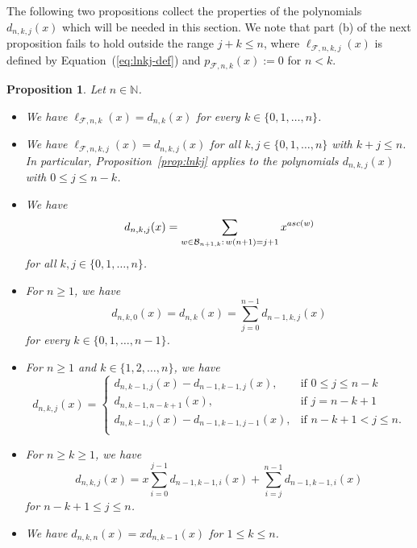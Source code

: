 \documentclass[11pt]{amsart}
\newtheorem{proposition}[theorem]{Proposition}
\newcommand{\asc}{{\rm asc}}
\newcommand{\bB}{{\mathcal B}}
\newcommand{\fF}{{\mathcal F}}
\newcommand{\NN}{{\mathbb N}}
\begin{document}
The following two propositions collect the 
properties of the polynomials $d_{n,k,j}(x)$ which
will be needed in this section. We note that part 
(b) of the next proposition fails to hold outside 
the range $j+k \le n$, where $\ell_{\fF,n,k,j}(x)$
is defined by Equation~(\ref{eq:lnkj-def}) and 
$p_{\fF,n,k}(x) := 0$ for $n<k$.
%
\begin{proposition} \label{prop:dnkj} 
Let $n \in \NN$.
%
\begin{itemize}
\itemsep=0pt
\item[(a)] 
We have $\ell_{\fF,n,k}(x) = d_{n,k}(x)$ for every 
$k \in \{0, 1,\dots,n\}$.

\item[(b)] 
We have $\ell_{\fF,n,k,j}(x) = d_{n,k,j}(x)$ for all 
$k, j \in \{0, 1,\dots,n\}$ with $k + j \le n$. In 
particular, Proposition~\ref{prop:lnkj} applies to 
the polynomials $d_{n,k,j}(x)$ with $0 \le j \le n-k$.

\item[(c)] 
We have 
%
\[ d_{n,k,j}(x) = \sum_{w \in \bB_{n+1,k}: \, 
                  w(n+1) = j+1} x^{\asc(w)} \]
%
for all $k, j \in \{0, 1,\dots,n\}$.

\item[(d)] 
For $n \ge 1$, we have
%
\[ d_{n,k,0}(x) = d_{n,k}(x) = \sum_{j=0}^{n-1} 
                  d_{n-1,k,j}(x) \]
%
for every $k \in \{0, 1,\dots,n-1\}$.

\item[(e)] 
For $n \ge 1$ and $k \in \{1, 2,\dots,n\}$, we have 
%
\[ d_{n,k,j}(x) = \begin{cases}
   d_{n,k-1,j}(x) - d_{n-1,k-1,j}(x), & 
	        \text{if $0 \le j \le n-k$} \\
   d_{n,k-1,n-k+1}(x), & \text{if $j = n-k+1$} \\
	 d_{n,k-1,j}(x) - d_{n-1,k-1,j-1}(x), & 
	        \text{if $n-k+1 < j \le n$.} \\
                  \end{cases} \]

\item[(f)] 
For $n \ge k \ge 1$, we have
%
\[ d_{n,k,j}(x) = x \sum_{i=0}^{j-1} d_{n-1,k-1,i}(x) 
                  + \sum_{i=j}^{n-1} d_{n-1,k-1,i}(x) 
									  \]
%
for $n-k+1 \le j \le n$.

\item[(g)]
We have $d_{n,k,n}(x) = x d_{n,k-1}(x)$ for $1 \le k 
\le n$.

\end{itemize}
\end{proposition}
\end{document}
